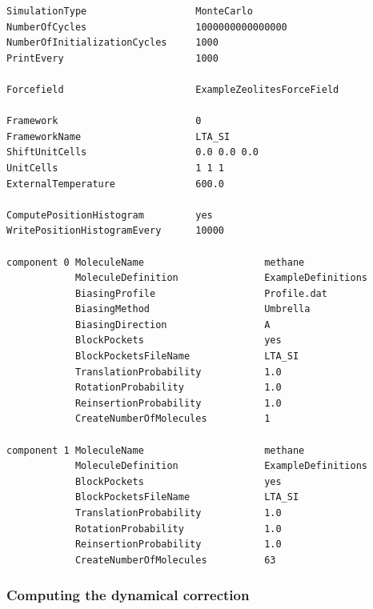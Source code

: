 \begin{tiny}
\begin{verbatim}
SimulationType                   MonteCarlo
NumberOfCycles                   1000000000000000
NumberOfInitializationCycles     1000
PrintEvery                       1000

Forcefield                       ExampleZeolitesForceField

Framework                        0
FrameworkName                    LTA_SI
ShiftUnitCells                   0.0 0.0 0.0
UnitCells                        1 1 1
ExternalTemperature              600.0

ComputePositionHistogram         yes
WritePositionHistogramEvery      10000

component 0 MoleculeName                     methane
            MoleculeDefinition               ExampleDefinitions
            BiasingProfile                   Profile.dat
            BiasingMethod                    Umbrella
            BiasingDirection                 A
            BlockPockets                     yes
            BlockPocketsFileName             LTA_SI
            TranslationProbability           1.0
            RotationProbability              1.0
            ReinsertionProbability           1.0
            CreateNumberOfMolecules          1

component 1 MoleculeName                     methane
            MoleculeDefinition               ExampleDefinitions
            BlockPockets                     yes
            BlockPocketsFileName             LTA_SI
            TranslationProbability           1.0
            RotationProbability              1.0
            ReinsertionProbability           1.0
            CreateNumberOfMolecules          63
\end{verbatim}
\end{tiny}

\subsubsection{Computing the dynamical correction}

